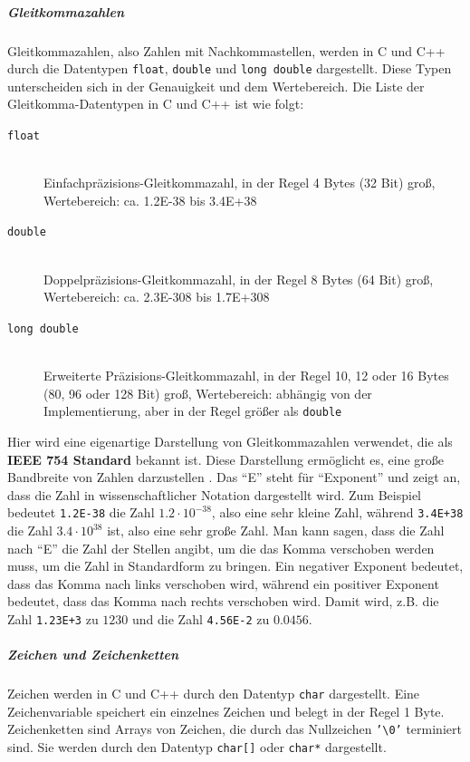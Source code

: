 \subparagraph{Gleitkommazahlen}

Gleitkommazahlen, also Zahlen mit Nachkommastellen, werden in C und C++ durch die Datentypen \texttt{float}, \texttt{double} und \texttt{long double} dargestellt. Diese Typen unterscheiden sich in der Genauigkeit und dem Wertebereich. Die Liste der Gleitkomma-Datentypen in C und C++ ist wie folgt:
\begin{description}
  \item[\texttt{float}]\hfill\\
   Einfachpräzisions-Gleitkommazahl, in der Regel 4 Bytes (32 Bit) groß, Wertebereich: ca. 1.2E-38 bis 3.4E+38
  \item[\texttt{double}]\hfill\\
   Doppelpräzisions-Gleitkommazahl, in der Regel 8 Bytes (64 Bit) groß, Wertebereich: ca. 2.3E-308 bis 1.7E+308
  \item[\texttt{long double}]\hfill\\
   Erweiterte Präzisions-Gleitkommazahl, in der Regel 10, 12 oder 16 Bytes (80, 96 oder 128 Bit) groß, Wertebereich: abhängig von der Implementierung, aber in der Regel größer als \texttt{double}
\end{description}
Hier wird eine eigenartige Darstellung von Gleitkommazahlen verwendet, die als \textbf{IEEE 754 Standard} bekannt ist. Diese Darstellung ermöglicht es, eine große Bandbreite von Zahlen darzustellen
. Das ``E'' steht für ``Exponent'' und zeigt an, dass die Zahl in wissenschaftlicher Notation dargestellt wird. Zum Beispiel bedeutet \texttt{1.2E-38} die Zahl $1.2 \cdot 10^{-38}$, also eine sehr kleine Zahl, während \texttt{3.4E+38} die Zahl $3.4 \cdot 10^{38}$ ist, also eine sehr große Zahl. Man kann sagen, dass die Zahl nach ``E'' die Zahl der Stellen angibt, um die das Komma verschoben werden muss, um die Zahl in Standardform zu bringen. Ein negativer Exponent bedeutet, dass das Komma nach links verschoben wird, während ein positiver Exponent bedeutet, dass das Komma nach rechts verschoben wird. Damit wird, z.B. die Zahl \texttt{1.23E+3} zu $1230$ und die Zahl \texttt{4.56E-2} zu $0.0456$.

\subparagraph{Zeichen und Zeichenketten}
Zeichen werden in C und C++ durch den Datentyp \texttt{char} dargestellt. Eine Zeichenvariable speichert ein einzelnes Zeichen und belegt in der Regel 1 Byte. Zeichenketten sind Arrays von Zeichen, die durch das Nullzeichen \texttt{'\textbackslash0'} terminiert sind. Sie werden durch den Datentyp \texttt{char[]} oder \texttt{char*} dargestellt.

